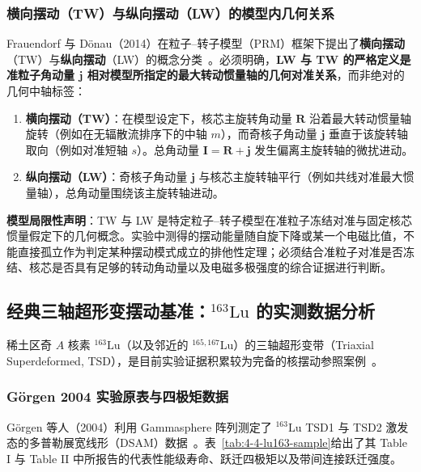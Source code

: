 \subsubsection{横向摆动（TW）与纵向摆动（LW）的模型内几何关系}

Frauendorf 与 Dönau（2014）在粒子--转子模型（PRM）框架下提出了\textbf{横向摆动}（TW）与\textbf{纵向摆动}（LW）的概念分类~\cite{frauendorf-2014-transverse-wobbling}。必须明确，\textbf{LW 与 TW 的严格定义是准粒子角动量 $\mathbf{j}$ 相对模型所指定的最大转动惯量轴的几何对准关系}，而非绝对的几何中轴标签：
\begin{enumerate}
\item \textbf{横向摆动（TW）}：在模型设定下，核芯主旋转角动量 $\mathbf{R}$ 沿着最大转动惯量轴旋转（例如在无辐散流排序下的中轴 $m$），而奇核子角动量 $\mathbf{j}$ 垂直于该旋转轴取向（例如对准短轴 $s$）。总角动量 $\mathbf{I} = \mathbf{R} + \mathbf{j}$ 发生偏离主旋转轴的微扰进动。
\item \textbf{纵向摆动（LW）}：奇核子角动量 $\mathbf{j}$ 与核芯主旋转轴平行（例如共线对准最大惯量轴），总角动量围绕该主旋转轴进动。
\end{enumerate}

\textbf{模型局限性声明}：TW 与 LW 是特定粒子--转子模型在准粒子冻结对准与固定核芯惯量假定下的几何概念。实验中测得的摆动能量随自旋下降或某一个电磁比值，不能直接孤立作为判定某种摆动模式成立的排他性定理；必须结合准粒子对准是否冻结、核芯是否具有足够的转动角动量以及电磁多极强度的综合证据进行判断。

\subsection{经典三轴超形变摆动基准：$^{163}\mathrm{Lu}$ 的实测数据分析}\label{sec:4-4-2}

稀土区奇 $A$ 核素 $^{163}\mathrm{Lu}$（以及邻近的 $^{165,167}\mathrm{Lu}$）的三轴超形变带（Triaxial Superdeformed, TSD），是目前实验证据积累较为完备的核摆动参照案例~\cite{odegard-2001-evidence-wobbling-163lu,jensen-2002-second-phonon-wobbling-163lu,campaign-g07-gorgen-2004-163lu-quadrupole-moments}。

\subsubsection{Görgen 2004 实验原表与四极矩数据}

Görgen 等人（2004）利用 Gammasphere 阵列测定了 $^{163}\mathrm{Lu}$ TSD1 与 TSD2 激发态的多普勒展宽线形（DSAM）数据~\cite{campaign-g07-gorgen-2004-163lu-quadrupole-moments}。表~\ref{tab:4-4-lu163-sample}给出了其 Table I 与 Table II 中所报告的代表性能级寿命、跃迁四极矩以及带间连接跃迁强度。

